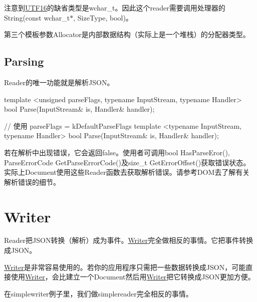 注意到{\ttfamily \hyperlink{struct_u_t_f16}{U\+T\+F16}}的缺省类型是{\ttfamily wchar\+\_\+t}。因此这个{\ttfamily reader}需要调用处理器的{\ttfamily String(const wchar\+\_\+t$\ast$, Size\+Type, bool)}。

第三个模板参数{\ttfamily Allocator}是内部数据结构（实际上是一个堆栈）的分配器类型。\hypertarget{md_Commun_Externe_RapidJSON_doc_sax.zh-cn_Parsing}{}\subsection{Parsing}\label{md_Commun_Externe_RapidJSON_doc_sax.zh-cn_Parsing}
{\ttfamily Reader}的唯一功能就是解析\+J\+S\+O\+N。


\begin{DoxyCode}
\textcolor{keyword}{template} <\textcolor{keywordtype}{unsigned} parseFlags, \textcolor{keyword}{typename} InputStream, \textcolor{keyword}{typename} Handler>
\textcolor{keywordtype}{bool} Parse(InputStream& is, Handler& handler);

\textcolor{comment}{// 使用 parseFlags = kDefaultParseFlags}
\textcolor{keyword}{template} <\textcolor{keyword}{typename} InputStream, \textcolor{keyword}{typename} Handler>
\textcolor{keywordtype}{bool} Parse(InputStream& is, Handler& handler);
\end{DoxyCode}


若在解析中出现错误，它会返回{\ttfamily false}。使用者可调用{\ttfamily bool Has\+Parse\+Eror()}, {\ttfamily Parse\+Error\+Code Get\+Parse\+Error\+Code()}及{\ttfamily size\+\_\+t Get\+Error\+Offset()}获取错误状态。实际上{\ttfamily Document}使用这些{\ttfamily Reader}函数去获取解析错误。请参考D\+OM去了解有关解析错误的细节。\hypertarget{md_Commun_Externe_RapidJSON_doc_sax.zh-cn_Writer}{}\section{Writer}\label{md_Commun_Externe_RapidJSON_doc_sax.zh-cn_Writer}
{\ttfamily Reader}把\+J\+S\+O\+N转换（解析）成为事件。{\ttfamily \hyperlink{class_writer}{Writer}}完全做相反的事情。它把事件转换成\+J\+S\+O\+N。

{\ttfamily \hyperlink{class_writer}{Writer}}是非常容易使用的。若你的应用程序只需把一些数据转换成\+J\+S\+O\+N，可能直接使用{\ttfamily \hyperlink{class_writer}{Writer}}，会比建立一个{\ttfamily Document}然后用{\ttfamily \hyperlink{class_writer}{Writer}}把它转换成\+J\+S\+O\+N更加方便。

在{\ttfamily simplewriter}例子里，我们做{\ttfamily simplereader}完全相反的事情。


